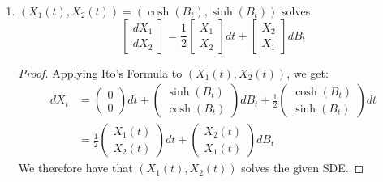 \documentclass[11pt]{article}
\begin{document}
\begin{enumerate}
\begin{proof}
We therefore have that $(X_1(t), X_2(t))$ solves the given SDE.
\end{proof}
\item $\left( X _ { 1 } ( t ) , X _ { 2 } ( t ) \right) = \left( \cosh \left( B _ { t } \right) , \sinh \left( B _ { t } \right) \right)$ solves $$\left[ \begin{array} { c } { d X _ { 1 } } \\ { d X _ { 2 } } \end{array} \right] = \frac { 1 } { 2 } \left[ \begin{array} { l } { X _ { 1 } } \\ { X _ { 2 } } \end{array} \right] d t + \left[ \begin{array} { c } { X _ { 2 } } \\ { X _ { 1 } } \end{array} \right] d B _ { t }
$$
\begin{proof}
Applying Ito's Formula to $(X_1(t), X_2(t))$, we get:
\begin{align*}
dX_t &=\begin{pmatrix}
0 \\ 0 
\end{pmatrix} dt + 
\begin{pmatrix}
\sinh(B_t) \\ \cosh(B_t)
\end{pmatrix} dB_t + 
\frac{1}{2} \begin{pmatrix}
\cosh(B_t) \\ \sinh(B_t)
\end{pmatrix} dt\\
&= \frac{1}{2} \begin{pmatrix}
X_1(t) \\ X_2(t)
\end{pmatrix} dt + 
\begin{pmatrix}
X_2(t) \\ X_1(t) 
\end{pmatrix} dB_t
\end{align*}
We therefore have that $(X_1(t), X_2(t))$ solves the given SDE.
\end{proof}
\end{enumerate} 
 \newcommand{\sectionbreak}{\clearpage}
\end{document}
